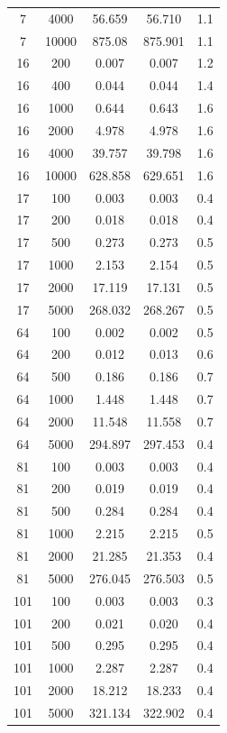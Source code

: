 \begin{small}
\begin{center}
\begin{longtable}{|c|c|c|c|c|}
7&4000&56.659&56.710&1.1\\
7&10000&875.08&875.901&1.1\\
16&200&0.007&0.007&1.2\\
16&400&0.044&0.044&1.4\\
16&1000&0.644&0.643&1.6\\
16&2000&4.978&4.978&1.6\\
16&4000&39.757&39.798&1.6\\
16&10000&628.858&629.651&1.6\\
17&100&0.003&0.003&0.4\\
17&200&0.018&0.018&0.4\\
17&500&0.273&0.273&0.5\\
17&1000&2.153&2.154&0.5\\
17&2000&17.119&17.131&0.5\\
17&5000&268.032&268.267&0.5\\
64&100&0.002&0.002&0.5\\
64&200&0.012&0.013&0.6\\
64&500&0.186&0.186&0.7\\
64&1000&1.448&1.448&0.7\\
64&2000&11.548&11.558&0.7\\
64&5000&294.897&297.453&0.4\\
81&100&0.003&0.003&0.4\\
81&200&0.019&0.019&0.4\\
81&500&0.284&0.284&0.4\\
81&1000&2.215&2.215&0.5\\
81&2000&21.285&21.353&0.4\\
81&5000&276.045&276.503&0.5\\
101&100&0.003&0.003&0.3\\
101&200&0.021&0.020&0.4\\
101&500&0.295&0.295&0.4\\
101&1000&2.287&2.287&0.4\\
101&2000&18.212&18.233&0.4\\
101&5000&321.134&322.902&0.4\\
  \end{longtable}
\end{center}


\end{small}
